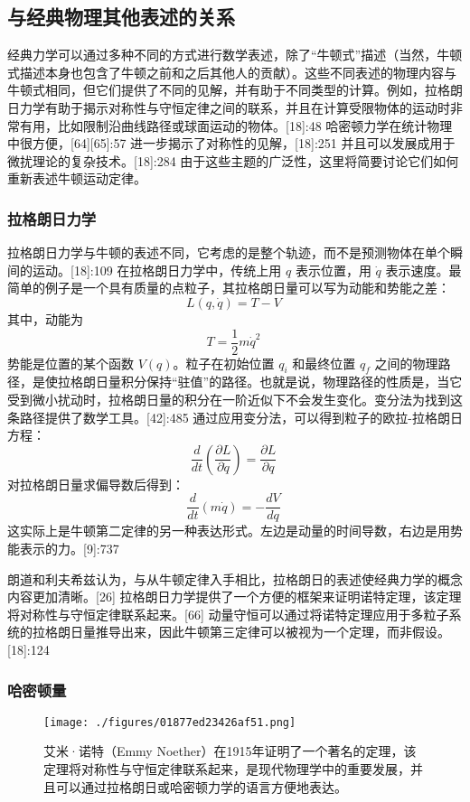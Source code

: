 \subsection{与经典物理其他表述的关系}  
经典力学可以通过多种不同的方式进行数学表述，除了“牛顿式”描述（当然，牛顿式描述本身也包含了牛顿之前和之后其他人的贡献）。这些不同表述的物理内容与牛顿式相同，但它们提供了不同的见解，并有助于不同类型的计算。例如，拉格朗日力学有助于揭示对称性与守恒定律之间的联系，并且在计算受限物体的运动时非常有用，比如限制沿曲线路径或球面运动的物体。[18]:48 哈密顿力学在统计物理中很方便，[64][65]:57 进一步揭示了对称性的见解，[18]:251 并且可以发展成用于微扰理论的复杂技术。[18]:284 由于这些主题的广泛性，这里将简要讨论它们如何重新表述牛顿运动定律。
\subsubsection{拉格朗日力学} 
拉格朗日力学与牛顿的表述不同，它考虑的是整个轨迹，而不是预测物体在单个瞬间的运动。[18]:109 在拉格朗日力学中，传统上用 \( q \) 表示位置，用 \( \dot{q} \) 表示速度。最简单的例子是一个具有质量的点粒子，其拉格朗日量可以写为动能和势能之差：
\[
L(q, \dot{q}) = T - V~
\]
其中，动能为
\[
T = \frac{1}{2} m \dot{q}^2~
\]
势能是位置的某个函数 \( V(q) \)。粒子在初始位置 \( q_i \) 和最终位置 \( q_f \) 之间的物理路径，是使拉格朗日量积分保持“驻值”的路径。也就是说，物理路径的性质是，当它受到微小扰动时，拉格朗日量的积分在一阶近似下不会发生变化。变分法为找到这条路径提供了数学工具。[42]:485 通过应用变分法，可以得到粒子的欧拉-拉格朗日方程：
\[
\frac{d}{dt}\left(\frac{\partial L}{\partial \dot{q}}\right) = \frac{\partial L}{\partial q}~
\]
对拉格朗日量求偏导数后得到：
\[
\frac{d}{dt}(m\dot{q}) = -\frac{dV}{dq}~
\]
这实际上是牛顿第二定律的另一种表达形式。左边是动量的时间导数，右边是用势能表示的力。[9]:737

朗道和利夫希兹认为，与从牛顿定律入手相比，拉格朗日的表述使经典力学的概念内容更加清晰。[26] 拉格朗日力学提供了一个方便的框架来证明诺特定理，该定理将对称性与守恒定律联系起来。[66] 动量守恒可以通过将诺特定理应用于多粒子系统的拉格朗日量推导出来，因此牛顿第三定律可以被视为一个定理，而非假设。[18]:124
\subsubsection{哈密顿量}

\begin{figure}[ht]
\centering
\texttt{[image: ./figures/01877ed23426af51.png]}
\caption{艾米·诺特（Emmy Noether）在1915年证明了一个著名的定理，该定理将对称性与守恒定律联系起来，是现代物理学中的重要发展，并且可以通过拉格朗日或哈密顿力学的语言方便地表达。} \label{fig_NEW01_11}
\end{figure}

